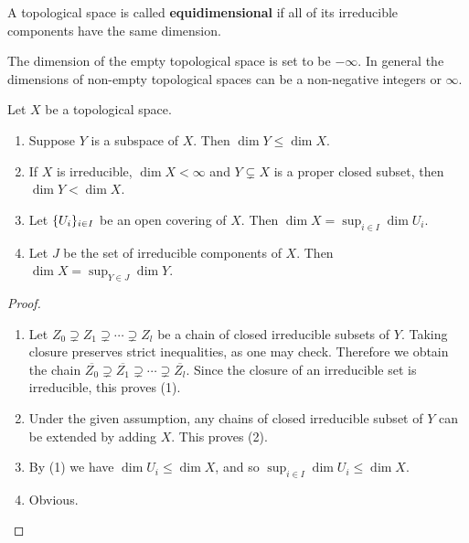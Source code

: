 \documentclass[12pt]{book}
\newcommand{\inlinedef}[1]{\textcolor{oxfordblue}{\bfseries #1}}
\theoremstyle{definition}
\DeclarePairedDelimiter{\Set}{\lbrace}{\rbrace}
\begin{document}
	A topological space is called \inlinedef{equidimensional} if all of its irreducible components have the same dimension.
	
	\begin{remark}
		The dimension of the empty topological space is set to be $-\infty$. In general the dimensions of non-empty topological spaces can be a non-negative integers or $\infty$. 
	\end{remark}
	
	\begin{lemma}
		Let $X$ be a topological space.
		\begin{enumerate}
			\item Suppose $Y$ is a subspace of $X$. Then $\dim Y \leq \dim X$.
			
			\item If $X$ is irreducible, $\dim X < \infty$ and $Y \subsetneq X$ is a proper closed subset, then $\dim Y < \dim X$.
			
			\item Let $\Set{U_i}_{i \in I}$ be an open covering of $X$. Then $\dim X = \sup_{i \in I} \dim U_i$.
			
			\item Let $J$ be the set of irreducible components of $X$. Then $\dim X = \sup_{Y \in J} \dim Y$.
		\end{enumerate}
	\end{lemma}
	\begin{proof}
		\begin{enumerate}
			\item Let $Z_0 \supsetneq Z_1 \supsetneq \dotsb \supsetneq Z_l$ be a chain of closed irreducible subsets of $Y$. Taking closure preserves strict inequalities, as one may check. Therefore we obtain the chain $\overline{Z_0} \supsetneq\overline{ Z_1} \supsetneq \dotsb \supsetneq \overline{Z_l}$.
			Since the closure of an irreducible set is irreducible, this proves (1).
			
			\item Under the given assumption, any chains of closed irreducible subset of $Y$ can be extended by adding $X$. This proves (2).
			
			\item By (1) we have $\dim U_i \leq \dim X$, and so $\sup_{i \in I}\dim U_i \leq \dim X$.
			
			\item Obvious.	\qedhere
		\end{enumerate}
	\end{proof}
	
\end{document}
